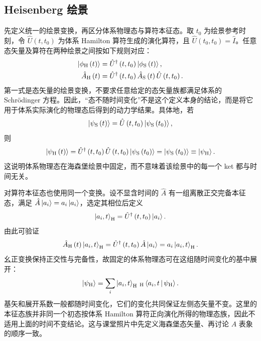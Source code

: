 \subsection{Heisenberg 绘景}
先定义统一的绘景变换，再区分体系物理态与算符本征态。取 $t_0$ 为绘景参考时刻，令 $\hat U\left(t,t_0\right)$ 为体系 Hamilton 算符生成的演化算符，且 $\hat U\left(t_0,t_0\right)=\hat I$。任意态矢量及算符在两种绘景之间按如下规则对应：
\begin{align}
\Ket{\phi_{\mathrm{H}}\left(t\right)}
&=\hat U^\dag\left(t,t_0\right)\Ket{\phi_{\mathrm{S}}\left(t\right)},\\
\hat A_{\mathrm{H}}\left(t\right)
&=\hat U^\dag\left(t,t_0\right)\hat A_{\mathrm{S}}\left(t\right)
\hat U\left(t,t_0\right).
\end{align}
第一式是态矢量的绘景变换，不要求任意给定的态矢量族都满足体系的 Schr\"odinger 方程。因此，“态不随时间变化”不是这个定义本身的结论，而是将它用于体系实际演化的物理态后得到的动力学结果。具体地，若
\begin{equation}
\Ket{\psi_{\mathrm{S}}\left(t\right)}
=\hat U\left(t,t_0\right)\Ket{\psi_{\mathrm{S}}\left(t_0\right)},
\end{equation}
则
\begin{equation}
\Ket{\psi_{\mathrm{H}}\left(t\right)}
=\hat U^\dag\left(t,t_0\right)\hat U\left(t,t_0\right)
\Ket{\psi_{\mathrm{S}}\left(t_0\right)}
=\Ket{\psi_{\mathrm{S}}\left(t_0\right)}
\equiv\Ket{\psi_{\mathrm{H}}}.
\end{equation}
这说明体系物理态在海森堡绘景中固定，而不意味着该绘景中的每一个 ket 都与时间无关。

对算符本征态也使用同一个变换。设不显含时间的 $\hat A$ 有一组离散正交完备本征态，满足 $\hat A\Ket{a_i}=a_i\Ket{a_i}$，选定其相位后定义
\begin{equation}
\Ket{a_i,t}_{\mathrm{H}}
=\hat U^\dag\left(t,t_0\right)\Ket{a_i}.
\end{equation}
由此可验证
\begin{equation}
\hat A_{\mathrm{H}}\left(t\right)\Ket{a_i,t}_{\mathrm{H}}
=\hat U^\dag\left(t,t_0\right)\hat A\Ket{a_i}
=a_i\Ket{a_i,t}_{\mathrm{H}}.
\end{equation}
幺正变换保持正交性与完备性，故固定的体系物理态可在这组随时间变化的基中展开：
\begin{equation}
\Ket{\psi_{\mathrm{H}}}
=\sum_i\Ket{a_i,t}_{\mathrm{H}}
\,{}_{\mathrm{H}}\Braket{a_i,t|\psi_{\mathrm{H}}}.
\end{equation}
基矢和展开系数一般都随时间变化，它们的变化共同保证左侧态矢量不变。这里的本征态族并非同一个初态按体系 Hamilton 算符正向演化所得的物理态族，因此不适用上面的时间不变结论。这与课堂照片中先定义海森堡态矢量、再讨论 $A$ 表象的顺序一致。

